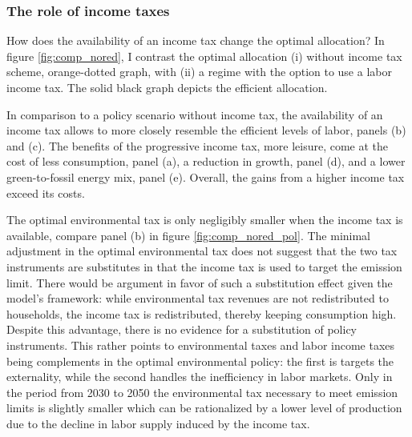 
\subsubsection{The role of income taxes}\label{subsec:notaul}
How does the availability of an income tax change the optimal allocation? 
In figure \ref{fig:comp_nored}, I contrast the optimal allocation (i) without income tax scheme, orange-dotted graph, with (ii) a regime with the option to use a labor income tax. The solid black graph depicts the efficient allocation. %


In comparison to a policy scenario without income tax, the availability of an income tax allows to more closely resemble the efficient levels of labor, panels (b) and (c). %
The benefits of the progressive income tax, more leisure, come at the cost of less consumption, panel (a), a reduction in growth, panel (d), and a lower green-to-fossil energy mix, panel (e). Overall, the gains from a higher income tax exceed its costs. \textit{}

The optimal environmental tax is only negligibly smaller when the income tax is available, compare panel (b) in figure \ref{fig:comp_nored_pol}. 
The minimal adjustment in the optimal environmental tax does not suggest  that the two tax instruments are substitutes in that the income tax is used to target the emission limit. There would be argument in favor of such a substitution effect given the model's framework: while environmental tax revenues are not redistributed to households, the income tax is redistributed, thereby keeping consumption high. Despite this advantage, there is no evidence for a substitution of policy instruments. This rather points to environmental taxes and labor income taxes being complements in the optimal environmental policy: the first is targets the externality, while the second handles the inefficiency in labor markets. 
Only in the period from 2030 to 2050 the environmental tax necessary to meet emission limits is slightly smaller which can be rationalized by a lower level of production due to the decline in labor supply induced by the income tax.

